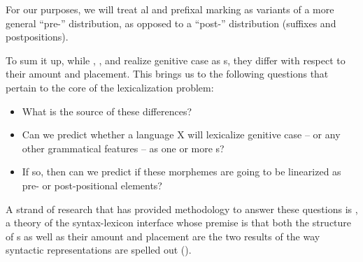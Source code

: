 For our purposes, we will treat al and prefixal marking as variants of a more general ``pre-'' distribution, as opposed to a ``post-'' distribution (suffixes and postpositions).
\par To sum it up, while , , and  realize genitive case as s, they differ with respect to their amount and placement. This brings us to the following questions that pertain to the core of the lexicalization problem: 

\begin{itemize}
\item What is the source of these differences?
\item  Can we predict whether a language X will lexicalize genitive case -- or any other grammatical features -- as one or more s? 
\item If so, then can we predict if these morphemes are going to be linearized as pre- or post-positional  elements? 
\end{itemize}
 
\par A strand of research that has provided methodology to answer these questions is , a theory of the syntax-lexicon interface whose premise is that both the  structure of s as well as their amount and placement are the two results of the way syntactic representations are spelled out (\citealt{Starke2009,Starke2014}). 
\par

